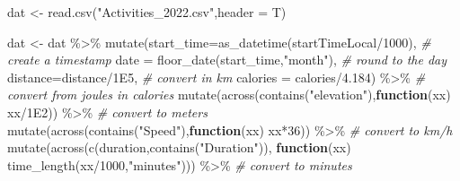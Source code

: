 \documentclass[
]{article}
\newenvironment{Shaded}{\begin{snugshade}}{\end{snugshade}}
\newcommand{\AttributeTok}[1]{\textcolor[rgb]{0.77,0.63,0.00}{#1}}
\newcommand{\CommentTok}[1]{\textcolor[rgb]{0.56,0.35,0.01}{\textit{#1}}}
\newcommand{\ControlFlowTok}[1]{\textcolor[rgb]{0.13,0.29,0.53}{\textbf{#1}}}
\newcommand{\DecValTok}[1]{\textcolor[rgb]{0.00,0.00,0.81}{#1}}
\newcommand{\FloatTok}[1]{\textcolor[rgb]{0.00,0.00,0.81}{#1}}
\newcommand{\FunctionTok}[1]{\textcolor[rgb]{0.00,0.00,0.00}{#1}}
\newcommand{\NormalTok}[1]{#1}
\newcommand{\OtherTok}[1]{\textcolor[rgb]{0.56,0.35,0.01}{#1}}
\newcommand{\SpecialCharTok}[1]{\textcolor[rgb]{0.00,0.00,0.00}{#1}}
\newcommand{\StringTok}[1]{\textcolor[rgb]{0.31,0.60,0.02}{#1}}
\begin{document}
\begin{Shaded}
\begin{Highlighting}[]
\NormalTok{dat }\OtherTok{\textless{}{-}} \FunctionTok{read.csv}\NormalTok{(}\StringTok{"Activities\_2022.csv"}\NormalTok{,}\AttributeTok{header =}\NormalTok{ T)}

\NormalTok{dat }\OtherTok{\textless{}{-}}\NormalTok{ dat }\SpecialCharTok{\%\textgreater{}\%} 
  \FunctionTok{mutate}\NormalTok{(}\AttributeTok{start\_time=}\FunctionTok{as\_datetime}\NormalTok{(startTimeLocal}\SpecialCharTok{/}\DecValTok{1000}\NormalTok{), }\CommentTok{\# create a timestamp}
         \AttributeTok{date =} \FunctionTok{floor\_date}\NormalTok{(start\_time,}\StringTok{"month"}\NormalTok{), }\CommentTok{\# round to the day}
         \AttributeTok{distance=}\NormalTok{distance}\SpecialCharTok{/}\FloatTok{1E5}\NormalTok{, }\CommentTok{\# convert in km}
         \AttributeTok{calories =}\NormalTok{ calories}\SpecialCharTok{/}\FloatTok{4.184}\NormalTok{) }\SpecialCharTok{\%\textgreater{}\%} \CommentTok{\# convert from joules in calories}
  \FunctionTok{mutate}\NormalTok{(}\FunctionTok{across}\NormalTok{(}\FunctionTok{contains}\NormalTok{(}\StringTok{"elevation"}\NormalTok{),}\ControlFlowTok{function}\NormalTok{(xx) xx}\SpecialCharTok{/}\FloatTok{1E2}\NormalTok{))  }\SpecialCharTok{\%\textgreater{}\%}  \CommentTok{\# convert to meters}
  \FunctionTok{mutate}\NormalTok{(}\FunctionTok{across}\NormalTok{(}\FunctionTok{contains}\NormalTok{(}\StringTok{"Speed"}\NormalTok{),}\ControlFlowTok{function}\NormalTok{(xx) xx}\SpecialCharTok{*}\DecValTok{36}\NormalTok{))  }\SpecialCharTok{\%\textgreater{}\%} \CommentTok{\# convert to km/h}
  \FunctionTok{mutate}\NormalTok{(}\FunctionTok{across}\NormalTok{(}\FunctionTok{c}\NormalTok{(duration,}\FunctionTok{contains}\NormalTok{(}\StringTok{"Duration"}\NormalTok{)),}
                \ControlFlowTok{function}\NormalTok{(xx) }\FunctionTok{time\_length}\NormalTok{(xx}\SpecialCharTok{/}\DecValTok{1000}\NormalTok{,}\StringTok{"minutes"}\NormalTok{))) }\SpecialCharTok{\%\textgreater{}\%} \CommentTok{\# convert to minutes}
  

\end{Highlighting}
\end{Shaded}
\end{document}
